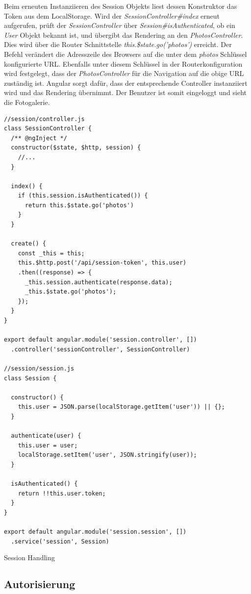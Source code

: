 Beim erneuten Instanziieren des Session Objekts liest dessen Konstruktor das Token aus dem LocalStorage. Wird der \textit{SessionController\#index} erneut aufgerufen, prüft der \textit{SessionController} über \textit{Session\#isAuthenticated}, ob ein \textit{User} Objekt bekannt ist, und übergibt das Rendering an den \textit{PhotosController}. Dies wird über die Router Schnittstelle \textit{this.\$state.go('photos')} erreicht. Der Befehl verändert die Adresszeile des Browsers auf die unter dem  \textit{photos} Schlüssel konfigurierte URL. Ebenfalls unter diesem Schlüssel in der Routerkonfiguration
wird festgelegt, dass der \textit{PhotosController} für die Navigation auf die obige URL zuständig ist. Angular sorgt dafür, dass der entsprechende Controller instanziiert wird und das Rendering übernimmt. Der Benutzer ist somit eingeloggt und sieht die Fotogalerie.

\begin{listing}[H]
\begin{verbatim}
//session/controller.js
class SessionController {
  /** @ngInject */
  constructor($state, $http, session) {
    //...
  }

  index() {
    if (this.session.isAuthenticated()) {
      return this.$state.go('photos')
    }
  }

  create() {
    const _this = this;
    this.$http.post('/api/session-token', this.user)
    .then((response) => {
      _this.session.authenticate(response.data);
      _this.$state.go('photos');
    });
  }
}

export default angular.module('session.controller', [])
  .controller('sessionController', SessionController)

//session/session.js
class Session {

  constructor() {
    this.user = JSON.parse(localStorage.getItem('user')) || {};
  }

  authenticate(user) {
    this.user = user;
    localStorage.setItem('user', JSON.stringify(user));
  }

  isAuthenticated() {
    return !!this.user.token;
  }
}

export default angular.module('session.session', [])
  .service('session', Session)

\end{verbatim}
\caption{Session Handling}
\label{lst:session_handling}
\end{listing}

\subsection{Autorisierung}

